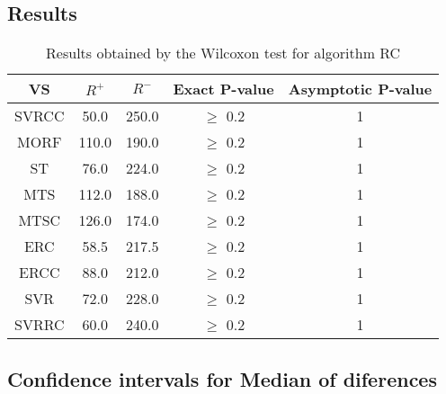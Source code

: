 \documentclass[a4paper,10pt]{article}
\begin{document}
\subsection{Results}

\begin{table}[!htp]
\centering\small
\begin{tabular}{
|c|c|c|c|c|}
\hline
 VS & $R^{+}$ & $R^{-}$ & Exact P-value & Asymptotic P-value \\ \hline 
SVRCC & 50.0 & 250.0 & $\geq$ 0.2 & 1\\ \hline 
MORF & 110.0 & 190.0 & $\geq$ 0.2 & 1\\ \hline 
ST & 76.0 & 224.0 & $\geq$ 0.2 & 1\\ \hline 
MTS & 112.0 & 188.0 & $\geq$ 0.2 & 1\\ \hline 
MTSC & 126.0 & 174.0 & $\geq$ 0.2 & 1\\ \hline 
ERC & 58.5 & 217.5 & $\geq$ 0.2 & 1\\ \hline 
ERCC & 88.0 & 212.0 & $\geq$ 0.2 & 1\\ \hline 
SVR & 72.0 & 228.0 & $\geq$ 0.2 & 1\\ \hline 
SVRRC & 60.0 & 240.0 & $\geq$ 0.2 & 1\\ \hline 

\end{tabular}
\caption{Results obtained by the Wilcoxon test for algorithm RC}
\end{table}

\subsection{Confidence intervals for Median of diferences}
\end{document}
